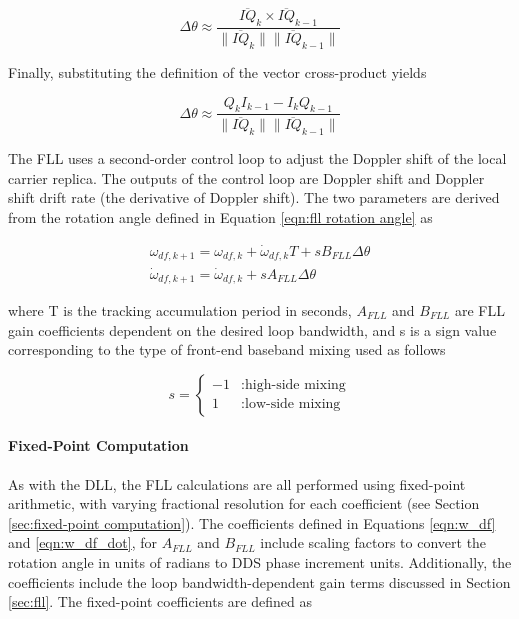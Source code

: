 \documentclass[12pt]{article}
\begin{document}
\begin{equation*}
\Delta \theta \approx \frac{\overline{IQ}_{k} \times \overline{IQ}_{k-1}}{\lVert \overline{IQ}_{k} \rVert \lVert \overline{IQ}_{k-1} \rVert}
\end{equation*}

Finally, substituting the definition of the vector cross-product yields

\begin{equation}
\label{eqn:fll rotation angle}
\Delta \theta \approx \frac{Q_{k}I_{k-1}-I_{k}Q_{k-1}}{\lVert \overline{IQ}_{k} \rVert \lVert \overline{IQ}_{k-1} \rVert}
\end{equation}

The FLL uses a second-order control loop to adjust the Doppler shift of the local carrier replica. The outputs of the control loop are Doppler shift and Doppler shift drift rate (the derivative of Doppler shift). The two parameters are derived from the rotation angle defined in Equation \ref{eqn:fll rotation angle} as

\begin{gather}
\label{eqn:w_df}
\omega_{df,k+1}=\omega_{df,k}+\dot{\omega}_{df,k}T+s B_{FLL}\Delta\theta \\
\label{eqn:w_df_dot}
\dot{\omega}_{df,k+1}=\dot{\omega}_{df,k}+s A_{FLL}\Delta\theta
\end{gather}

where T is the tracking accumulation period in seconds, $A_{FLL}$ and $B_{FLL}$ are FLL gain coefficients dependent on the desired loop bandwidth, and s is a sign value corresponding to the type of front-end baseband mixing used as follows

\begin{equation*}
s=\begin{cases} -1 & : \text{high-side mixing} \\
                               1 & : \text{low-side mixing} \end{cases}
\end{equation*}

\paragraph{Fixed-Point Computation}
As with the DLL, the FLL calculations are all performed using fixed-point arithmetic, with varying fractional resolution for each coefficient (see Section \ref{sec:fixed-point computation}). The coefficients defined in Equations \ref{eqn:w_df} and \ref{eqn:w_df_dot}, for  $A_{FLL}$ and $B_{FLL}$ include scaling factors to convert the rotation angle in units of radians to DDS phase increment units. Additionally, the coefficients include the loop bandwidth-dependent gain terms discussed in Section \ref{sec:fll}. The fixed-point coefficients are defined as
\end{document}
